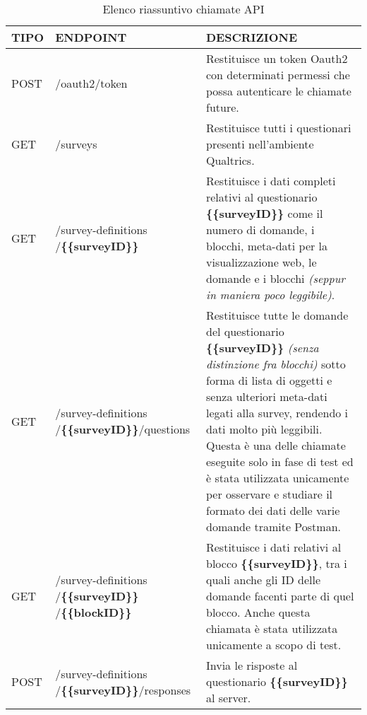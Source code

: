 \begin{table}[h!]
\def\arraystretch{1.5}
\begin{tabular}{| m{3em} | m{12em} | m{18em} |}
 \hline
 \textbf{TIPO} & \textbf{ENDPOINT} & \textbf{DESCRIZIONE} \\
 \hline \hline
 
 POST & /oauth2/token & Restituisce un token Oauth2 con determinati permessi che possa autenticare le chiamate future. \\ 
 \hline
 
 GET & /surveys & Restituisce tutti i questionari presenti nell'ambiente Qualtrics. \\
 \hline
 
 GET & /survey-definitions /\textbf{\{\{surveyID\}\}} & Restituisce i dati completi relativi al questionario \textbf{\{\{surveyID\}\}} come il numero di domande, i blocchi, meta-dati per la visualizzazione web, le domande e i blocchi \textit{(seppur in maniera poco leggibile)}. \\
 \hline
 
 GET & /survey-definitions /\textbf{\{\{surveyID\}\}}/questions & Restituisce tutte le domande del questionario \textbf{\{\{surveyID\}\}} \textit{(senza distinzione fra blocchi)} sotto forma di lista di oggetti e senza ulteriori meta-dati legati alla survey, rendendo i dati molto più leggibili. Questa è una delle chiamate eseguite solo in fase di test ed è stata utilizzata unicamente per osservare e studiare il formato dei dati delle varie domande tramite Postman. \\
 \hline
 
 GET & /survey-definitions /\textbf{\{\{surveyID\}\}} /\textbf{\{\{blockID\}\}} & Restituisce i dati relativi al blocco \textbf{\{\{surveyID\}\}}, tra i quali anche gli ID delle domande facenti parte di quel blocco. Anche questa chiamata è stata utilizzata unicamente a scopo di test. \\
 \hline

 POST & /survey-definitions /\textbf{\{\{surveyID\}\}}/responses & Invia le risposte al questionario \textbf{\{\{surveyID\}\}} al server. \\
 \hline
 
\end{tabular}
\caption{Elenco riassuntivo chiamate API}
\label{table:api}
\end{table}